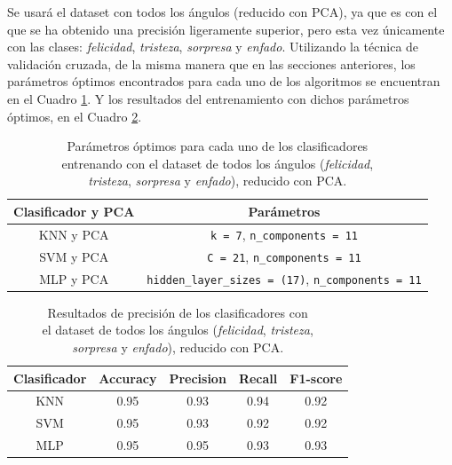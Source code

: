 Se usará el dataset con todos los ángulos (reducido con PCA), ya que es con el que se ha obtenido una precisión ligeramente superior, pero esta vez únicamente con las clases: \textit{felicidad}, \textit{tristeza}, \textit{sorpresa} y \textit{enfado}. Utilizando la técnica de validación cruzada, de la misma manera que en las secciones anteriores, los parámetros óptimos encontrados para cada uno de los algoritmos se encuentran en el Cuadro \ref{cuadro:parametros_dataset3}. Y los resultados del entrenamiento con dichos parámetros óptimos, en el Cuadro \ref{cuadro:resultados_dataset3}.\\

\begin{table}[H]
\begin{center}
\begin{tabular}{|c|c|}
     \hline
    \textbf{Clasificador y PCA} & \textbf{Parámetros} \\
    \hline
     KNN y PCA & \verb|k = 7|, \verb|n_components = 11|\\
     SVM y PCA & \verb|C = 21|, \verb|n_components = 11|\\
     MLP y PCA & \verb|hidden_layer_sizes = (17)|, \verb|n_components = 11|\\
     \hline
 \end{tabular}
 \captionsetup{justification=centering}
\caption{Parámetros óptimos para cada uno de los clasificadores\\
entrenando con el dataset de todos los ángulos (\textit{felicidad}, \\
\textit{tristeza}, \textit{sorpresa} y \textit{enfado}), reducido con PCA.}
\label{cuadro:parametros_dataset3}
\end{center}
\end{table}

\begin{table}[H]
\begin{center}
\begin{tabular}{|c|c|c|c|c|}
     \hline
    \textbf{Clasificador} & \textbf{Accuracy} & \textbf{Precision} & \textbf{Recall} & \textbf{F1-score}\\
    \hline
     KNN & 0.95 & 0.93 & 0.94 & 0.92\\
     SVM & 0.95 & 0.93 & 0.92 & 0.92\\
     MLP & 0.95 & 0.95 & 0.93 & 0.93\\
     \hline
 \end{tabular}
 \captionsetup{justification=centering}
\caption{Resultados de precisión de los clasificadores con\\
el dataset de todos los ángulos (\textit{felicidad}, \textit{tristeza}, \\
\textit{sorpresa} y \textit{enfado}), reducido con PCA.}
\label{cuadro:resultados_dataset3}
\end{center}
\end{table}

